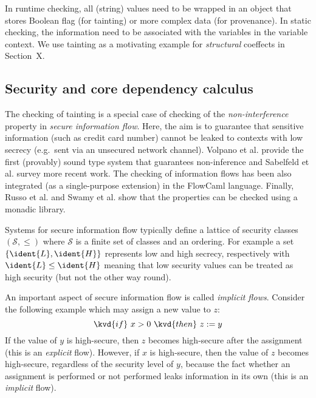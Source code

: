 In runtime checking, all (string) values need to be wrapped in an object that stores Boolean 
flag (for tainting) or more complex data (for provenance). In static checking, the information
need to be associated with the variables in the variable context. We use tainting as a motivating
example for \emph{structural} coeffects in Section~X.


\subsection{Security and core dependency calculus}

The checking of tainting is a special case of checking of the \emph{non-interference} property 
in \emph{secure information flow}. Here, the aim is to guarantee that sensitive information (such
as credit card number) cannot be leaked to contexts with low secrecy (e.g.~sent via an unsecured
network channel). Volpano et al. \cite{app-secure-flow} provide the first (provably) sound type 
system that guarantees non-inference and Sabelfeld et al. \cite{app-secure-information-flow} survey
more recent work. The checking of information flows has been also integrated (as a single-purpose
extension) in the FlowCaml \cite{app-security-flowcaml} language. Finally, Russo et al. and 
Swamy et al. \cite{monad-secure-flow,monads-lightweight-ml} show that the properties can be checked
using a monadic library.

Systems for secure information flow typically define a lattice of security classes $(\mathcal{S}, \leq)$
where $\mathcal{S}$ is a finite set of classes and an ordering. For example a set $\{\ident{L}, \ident{H}\}$ 
represents low and high secrecy, respectively with $\ident{L} \leq \ident{H}$ meaning that low security
values can be treated as high security (but not the other way round).

An important aspect of secure information flow is called \emph{implicit flows}. Consider the following
example which may assign a new value to $z$:
%
\begin{equation*}
\kvd{if}~x>0~\kvd{then}~z := y
\end{equation*}
%
If the value of $y$ is high-secure, then $z$ becomes high-secure after the assignment
(this is an \emph{explicit} flow). However, if $x$ is high-secure, then the value of
$z$ becomes high-secure, regardless of the security level of $y$, because the fact whether an 
assignment is performed or not performed leaks information in its own (this is an 
\emph{implicit} flow).

